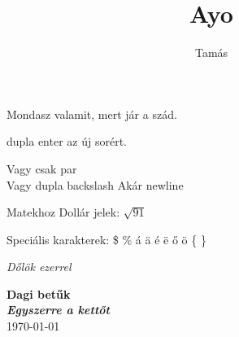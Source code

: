 \documentclass{article} %
\begin{document}
\title{Ayo}
\author{Tamás}
\maketitle


Mondasz valamit, mert jár a szád.

dupla enter az új sorért. \par
Vagy csak par \\
Vagy dupla backslash \newline
Akár newline

Matekhoz Dollár jelek: $\sqrt{91}$

Speciális karakterek: \$ \% \'a \"a \'e \"e \H{o} \"o \{ \} 

\textit{Dőlök ezerrel}

\textbf{Dagi betűk}\\
\textit{\textbf{Egyszerre a kettőt}}\\
\today
{}
\end{document}
